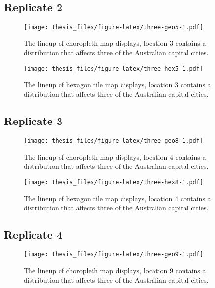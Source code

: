 \documentclass{monashthesis}
\begin{document}
\hypertarget{replicate-2-1}{%
\subsection{Replicate 2}\label{replicate-2-1}}

\begin{figure}
\centering
\texttt{[image: thesis\_files/figure-latex/three-geo5-1.pdf]}
\caption{\label{fig:three-geo5}The lineup of choropleth map displays, location 3 contains a distribution that affects three of the Australian capital cities.}
\end{figure}

\begin{figure}
\centering
\texttt{[image: thesis\_files/figure-latex/three-hex5-1.pdf]}
\caption{\label{fig:three-hex5}The lineup of hexagon tile map displays, location 3 contains a distribution that affects three of the Australian capital cities.}
\end{figure}

\hypertarget{replicate-3-1}{%
\subsection{Replicate 3}\label{replicate-3-1}}

\begin{figure}
\centering
\texttt{[image: thesis\_files/figure-latex/three-geo8-1.pdf]}
\caption{\label{fig:three-geo8}The lineup of choropleth map displays, location 4 contains a distribution that affects three of the Australian capital cities.}
\end{figure}

\begin{figure}
\centering
\texttt{[image: thesis\_files/figure-latex/three-hex8-1.pdf]}
\caption{\label{fig:three-hex8}The lineup of hexagon tile map displays, location 4 contains a distribution that affects three of the Australian capital cities.}
\end{figure}

\hypertarget{replicate-4-1}{%
\subsection{Replicate 4}\label{replicate-4-1}}

\begin{figure}
\centering
\texttt{[image: thesis\_files/figure-latex/three-geo9-1.pdf]}
\caption{\label{fig:three-geo9}The lineup of choropleth map displays, location 9 contains a distribution that affects three of the Australian capital cities.}
\end{figure}
\end{document}
